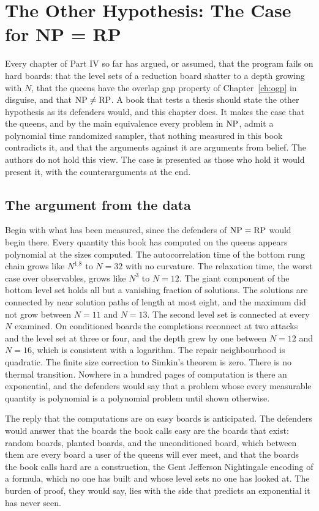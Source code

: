 \chapter{The Other Hypothesis: The Case for NP = RP}
\label{ch:otherhyp}

Every chapter of Part IV so far has argued, or assumed, that the program fails on hard boards: that the level sets of a reduction board shatter to a depth growing with $N$, that the queens have the overlap gap property of Chapter~\ref{ch:ogp} in disguise, and that $\mathrm{NP} \ne \mathrm{RP}$. A book that tests a thesis should state the other hypothesis as its defenders would, and this chapter does. It makes the case that the queens, and by the main equivalence every problem in $\mathrm{NP}$, admit a polynomial time randomized sampler, that nothing measured in this book contradicts it, and that the arguments against it are arguments from belief. The authors do not hold this view. The case is presented as those who hold it would present it, with the counterarguments at the end.

\section{The argument from the data}

Begin with what has been measured, since the defenders of $\mathrm{NP} = \mathrm{RP}$ would begin there. Every quantity this book has computed on the queens appears polynomial at the sizes computed. The autocorrelation time of the bottom rung chain grows like $N^{1.8}$ to $N = 32$ with no curvature. The relaxation time, the worst case over observables, grows like $N^{3}$ to $N = 12$. The giant component of the bottom level set holds all but a vanishing fraction of solutions. The solutions are connected by near solution paths of length at most eight, and the maximum did not grow between $N = 11$ and $N = 13$. The second level set is connected at every $N$ examined. On conditioned boards the completions reconnect at two attacks and the level set at three or four, and the depth grew by one between $N = 12$ and $N = 16$, which is consistent with a logarithm. The repair neighbourhood is quadratic. The finite size correction to Simkin's theorem is zero. There is no thermal transition. Nowhere in a hundred pages of computation is there an exponential, and the defenders would say that a problem whose every measurable quantity is polynomial is a polynomial problem until shown otherwise.

The reply that the computations are on easy boards is anticipated. The defenders would answer that the boards the book calls easy are the boards that exist: random boards, planted boards, and the unconditioned board, which between them are every board a user of the queens will ever meet, and that the boards the book calls hard are a construction, the Gent Jefferson Nightingale encoding of a formula, which no one has built and whose level sets no one has looked at. The burden of proof, they would say, lies with the side that predicts an exponential it has never seen.

